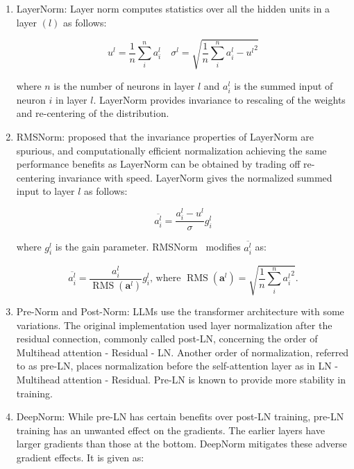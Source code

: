 \documentclass[a4paper,oneside]{book}
\begin{document}
\begin{enumerate}
    \item LayerNorm: Layer norm computes statistics over all the hidden units in a layer $(l)$ as follows:

          \begin{equation}
              u^{l} = \frac{1}{n} \sum_{i}^{n} a_{i}^{l} \quad \sigma^{l} = \sqrt{\frac{1}{n} \sum_{i}^{n}{a_{i}^{l}-u^{l}}^{2}}
          \end{equation}

          where $n$ is the number of neurons in layer $l$ and $a_{i}^{l}$ is the summed input of neuron $i$ in layer $l$. LayerNorm provides invariance to rescaling of the weights and re-centering of the distribution.

    \item RMSNorm: proposed that the invariance properties of LayerNorm are spurious, and computationally efficient normalization achieving the same performance benefits as LayerNorm can be obtained by trading off re-centering invariance with speed. LayerNorm gives the normalized summed input to layer $l$ as follows:

          \begin{equation}
              \overline{a_{i}^{l}} = \frac{a_{i}^{l}-u^{l}}{\sigma} g_{i}^{l}
          \end{equation}

          where $g_{i}^{l}$ is the gain parameter. RMSNorm~\cite{zhang2019root} modifies $\overline{a_{i}^{l}}$ as:

          \begin{equation}
              \overline{a_{i}^{l}} = \frac{a_{i}^{l}}{\operatorname{RMS}\left(\mathbf{a}^{l}\right)} g_{i}^{l} \text {, where } \operatorname{RMS}\left(\mathbf{a}^{l}\right) = \sqrt{\frac{1}{n} \sum_{i}^{n}{a_{i}^{l}}^{2}}.
          \end{equation}

    \item Pre-Norm and Post-Norm: LLMs use the transformer architecture with some variations. The original implementation used layer normalization after the residual connection, commonly called post-LN, concerning the order of Multihead attention - Residual - LN. Another order of normalization, referred to as pre-LN, places normalization before the self-attention layer as in LN - Multihead attention - Residual. Pre-LN is known to provide more stability in training.

    \item DeepNorm: While pre-LN has certain benefits over post-LN training, pre-LN training has an unwanted effect on the gradients. The earlier layers have larger gradients than those at the bottom. DeepNorm mitigates these adverse gradient effects. It is given as:


\end{enumerate}
\end{document}
